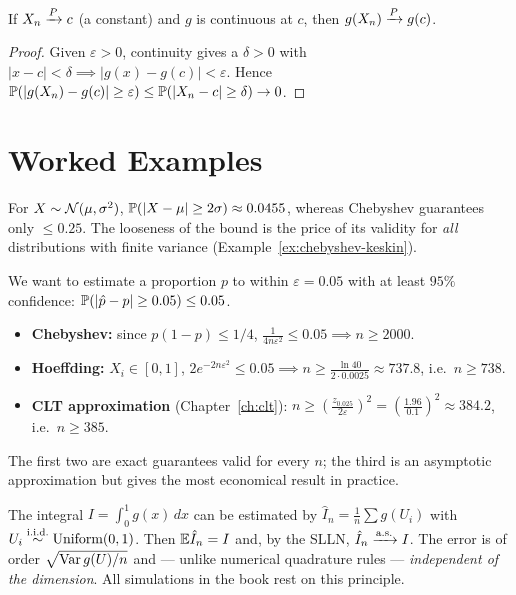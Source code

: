 \documentclass[main.tex]{subfiles}
\begin{document}
\begin{theorem}\label{thm:cmt-p}
If $X_n\pto c$ (a constant) and $g$ is continuous at $c$, then $g(X_n)\pto g(c)$.
\end{theorem}
\begin{proof}
Given $\varepsilon>0$, continuity gives a $\delta>0$ with $|x-c|<\delta\implies|g(x)-g(c)|<\varepsilon$. Hence $\P(|g(X_n)-g(c)|\ge\varepsilon)\le\P(|X_n-c|\ge\delta)\to0$.
\end{proof}

\section{Worked Examples}

\begin{example}
For $X\sim\Normal(\mu,\sigma^2)$, $\P(|X-\mu|\ge2\sigma)\approx0.0455$, whereas Chebyshev guarantees only $\le0.25$. The looseness of the bound is the price of its validity for \emph{all} distributions with finite variance (Example~\ref{ex:chebyshev-keskin}).
\end{example}

\begin{example}\label{ex:orneklem-buyuklugu}
We want to estimate a proportion $p$ to within $\varepsilon=0.05$ with at least $95\%$ confidence: $\P(|\hat p-p|\ge0.05)\le0.05$.
\begin{itemize}
  \item \textbf{Chebyshev:} since $p(1-p)\le1/4$, $\frac{1}{4n\varepsilon^2}\le0.05\implies n\ge2000$.
  \item \textbf{Hoeffding:} $X_i\in[0,1]$, $2e^{-2n\varepsilon^2}\le0.05\implies n\ge\frac{\ln 40}{2\cdot0.0025}\approx737.8$, i.e.\ $n\ge738$.
  \item \textbf{CLT approximation} (Chapter~\ref{ch:clt}): $n\ge\left(\frac{z_{0.025}}{2\varepsilon}\right)^2=\left(\frac{1.96}{0.1}\right)^2\approx384.2$, i.e.\ $n\ge385$.
\end{itemize}
The first two are exact guarantees valid for every $n$; the third is an asymptotic approximation but gives the most economical result in practice.
\end{example}

\begin{example}\label{ex:monte-carlo}
The integral $I=\int_0^1 g(x)\,dx$ can be estimated by $\hat I_n=\frac1n\sum g(U_i)$ with $U_i\iid\text{Uniform}(0,1)$. Then $\E\hat I_n=I$ and, by the SLLN, $\hat I_n\asto I$. The error is of order $\sqrt{\Var g(U)/n}$ and --- unlike numerical quadrature rules --- \emph{independent of the dimension}. All simulations in the book rest on this principle.
\end{example}
\end{document}
